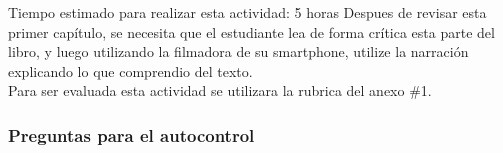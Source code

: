 \documentclass[a4paper,12pt,spanish]{article}
\begin{document}
\begin{tcolorbox}[skin=widget,
boxrule=1mm,
coltitle=black,
colframe=blue!45!white,
colback=blue!15!white,
width=(1\linewidth),before=\hfill,after=\hfill,
adjusted title={{\Large Actividad C1}:\textbf{Taller sobre el uso de termux y vim}}]
Tiempo estimado para realizar esta actividad: 5 horas
\tcblower
Despues de revisar esta primer capítulo, se necesita que el estudiante lea de forma crítica esta parte del libro, y luego utilizando la filmadora de su smartphone, utilize la narración explicando lo que comprendio del texto.\\

Para ser evaluada esta actividad se utilizara la rubrica del anexo \#1.


\end{tcolorbox}

\newpage
\subsubsection{Preguntas para el autocontrol}
\label{sec:preguntas-para-el}
\end{document}
